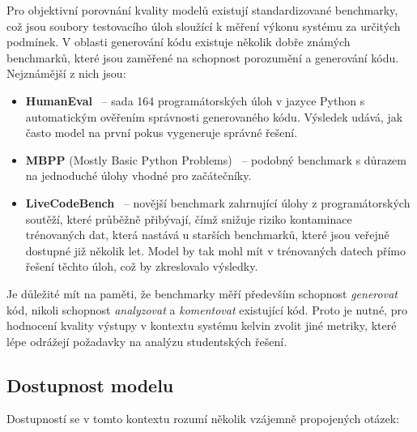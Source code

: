 Pro objektivní porovnání kvality modelů existují standardizované benchmarky, což jsou soubory testovacího úloh sloužící k měření výkonu systému za určitých podmínek.
V oblasti generování kódu existuje několik dobře známých benchmarků, které jsou zaměřené na schopnost porozumění a generování kódu.
Nejznámější z nich jsou:

\begin{itemize}
    \item \textbf{HumanEval}~\cite{humaneval} -- sada 164 programátorských úloh v jazyce Python s automatickým ověřením správnosti generovaného kódu.
    Výsledek udává, jak často model na první pokus vygeneruje správné řešení.

    \item \textbf{MBPP} (Mostly Basic Python Problems)~\cite{mbpp} -- podobný benchmark s důrazem na jednoduché úlohy vhodné pro začátečníky.

    \item \textbf{LiveCodeBench}~\cite{livecodebench} -- novější benchmark zahrnující úlohy z programátorských soutěží, které průběžně přibývají,
    čímž snižuje riziko kontaminace trénovaných dat, která nastává u starších benchmarků, které jsou veřejně dostupné již několik let.
    Model by tak mohl mít v trénovaných datech přímo řešení těchto úloh, což by zkreslovalo výsledky.
\end{itemize}

Je důležité mít na paměti, že benchmarky měří především schopnost \textit{generovat} kód, nikoli schopnost \textit{analyzovat} a \textit{komentovat} existující kód.
Proto je nutné, pro hodnocení kvality výstupy v kontextu systému kelvin zvolit jiné metriky, které lépe odrážejí požadavky na analýzu studentských řešení.


\subsection{Dostupnost modelu}
\label{subsec:criteria-availability}

Dostupností se v tomto kontextu rozumí několik vzájemně propojených otázek:


